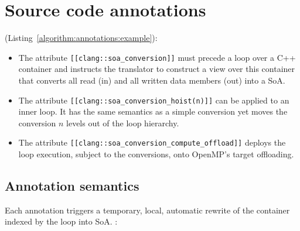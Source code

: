 \section{Source code annotations}
\label{section:annotations}



%
%
(Listing~\ref{algorithm:annotations:example}):

\begin{itemize}
  \item The attribute \texttt{[[clang::soa\_conversion]]} must precede a loop over a C++ container and instructs the translator to construct a view over this container that converts all read (in) and all written data members (out) into a SoA.
  \item The attribute \texttt{[[clang::soa\_conversion\_hoist(n)]]} can be applied to an inner loop. It has the same semantics as a simple conversion yet moves the conversion $n$ levels out of the loop hierarchy.
  \item The attribute \texttt{[[clang::soa\_conversion\_compute\_offload]]} deploys the loop execution, subject to the conversions, onto OpenMP's target offloading.
\end{itemize}


\subsection{Annotation semantics}
%
%
%
Each annotation triggers a temporary, local, automatic rewrite of the container indexed by the loop into SoA.
 \cite{Sung:2012:DataLayoutTransformations}:


